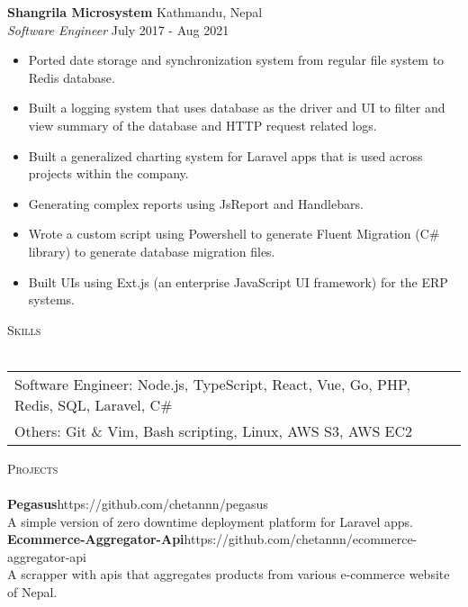 \documentclass[a4paper]{article}
\newcommand{\lineunder} {
    \vspace*{-8pt} \\
    \hspace*{-18pt} \hrulefill \\
}
\newcommand{\header} [1] {
    {\hspace*{-18pt}\vspace*{6pt} \textsc{#1}}
    \vspace*{-6pt} \lineunder
}
\begin{document}
\textbf{Shangrila Microsystem} \hfill Kathmandu, Nepal\\
\textit{Software Engineer} \hfill July 2017 - Aug 2021\\
\vspace{-1mm}
\begin{itemize} \itemsep 1pt
	\item Ported date storage and synchronization system from regular file system to Redis database.
	\item Built a logging system that uses database as the driver and UI to filter and view summary of the database and HTTP request related logs.
	\item Built a generalized charting system for Laravel apps that is used across projects within the company.
	\item Generating complex reports using JsReport and Handlebars.
	\item Wrote a custom script using Powershell to generate Fluent Migration (C\# library) to generate database migration files.
	\item Built UIs using Ext.js (an enterprise JavaScript UI framework) for the ERP systems.
\end{itemize}


\header{Skills}
\begin{tabularx}{\textwidth}{ l X } 
	Software Engineer:  Node.js, TypeScript, React, Vue, Go, PHP, Redis, SQL, Laravel, C\#      \\
	Others:       Git \& Vim, Bash scripting, Linux, AWS S3, AWS EC2  \\
\end{tabularx}
\vspace{2mm}

\header{Projects}
{\textbf{Pegasus}}\hfill https://github.com/chetannn/pegasus\\
A simple version of zero downtime deployment platform for Laravel apps.\\
\vspace*{2mm}
{\textbf{Ecommerce-Aggregator-Api}}\hfill https://github.com/chetannn/ecommerce-aggregator-api\\
A scrapper with apis that aggregates products from various e-commerce website of Nepal.\\
\vspace*{2mm}

\ 
\end{document}
